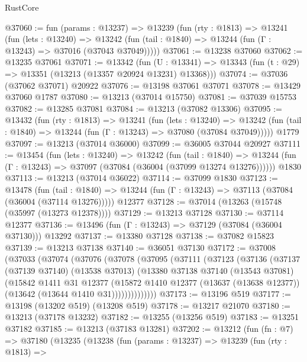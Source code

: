 \begin{lexlean}{RustCore}
\begin{coremodule}
@37060 := fun (params : @13237) =>
  @13239
    (fun (rty : @1813) =>
    @13241
      (fun (lets : @13240) =>
      @13242 (fun (tail : @1840) => @13244 (fun (Γ : @13243) => @37016 (@37043 @37049)))))
@37061 := @13238 @37060
@37062 := @13235 @37061
@37071 := @13342
    (fun (U : @13341) => @13343 (fun (t : @29) => @13351 (@13213 (@13357 @20924 @13231) @13368)))
@37074 := @37036 (@37062 @37071) @20922
@37076 := @13198 @37061 @37071
@37078 := @13429 @37060 @1787
@37080 := @13213 (@37014 @15750)
@37081 := @37039 @15753
@37082 := @13285 @37081
@37084 := @13213 (@37082 @13306)
@37095 := @13432
    (fun (rty : @1813) =>
    @13241
      (fun (lets : @13240) =>
      @13242 (fun (tail : @1840) => @13244 (fun (Γ : @13243) => @37080 (@37084 @37049)))))
    @1779
@37097 := @13213 (@37014 @36000)
@37099 := @36005 @37044 @20927
@37111 := @13454
    (fun (lets : @13240) =>
    @13242
      (fun (tail : @1840) =>
      @13244 (fun (Γ : @13243) => @37097 (@37084 (@36004 (@37099 @13274 @13276))))))
    @1830
@37113 := @13213 (@37014 @36022)
@37114 := @37099 @1830
@37123 := @13478
    (fun (tail : @1840) => @13244 (fun (Γ : @13243) => @37113 (@37084 (@36004 (@37114 @13276)))))
    @12377
@37128 := @37014 (@13263 (@15748 (@35997 (@13273 @12378))))
@37129 := @13213 @37128
@37130 := @37114 @12377
@37136 := @13496 (fun (Γ : @13243) => @37129 (@37084 (@36004 @37130))) @13292
@37137 := @13380 @37128
@37138 := @37082 @15823
@37139 := @13213 @37138
@37140 := @36051 @37130
@37172 := @37008
    (@37033
      (@37074
        (@37076
          (@37078
            (@37095
              (@37111
                (@37123
                  (@37136
                    (@37137
                      (@37139 @37140)
                      (@13538 @37013)
                      (@13380
                        @37138
                        @37140
                        (@13543 @37081)
                        (@15842
                          @1411
                          @31
                          @12377
                          (@15872
                            @1410
                            @12377
                            (@13637 (@13638 @12377))
                            (@13642 (@13644 @1410 @31))))))))))))))
@37173 := @13196 @519
@37177 := @13198 (@13202 @519) (@13208 @519)
@37178 := @13217 @21070
@37180 := @13213 (@37178 @13232)
@37182 := @13255 (@13256 @519)
@37183 := @13251 @37182
@37185 := @13213 (@37183 @13281)
@37202 := @13212
    (fun (fn : @7) =>
    @37180
      (@13235
        (@13238
          (fun (params : @13237) =>
          @13239
            (fun (rty : @1813) =>

\end{coremodule}
\end{lexlean}
